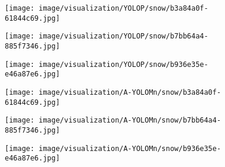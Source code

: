 \documentclass[lettersize,journal]{IEEEtran}
\begin{document}
\begin{figure*}[!h]
    \centering
    \begin{subfigure}[b]{0.05\textwidth}
        \centering
        \vspace{0.6cm} 
    \end{subfigure}\begin{subfigure}{0.25\textwidth}
        \centering
        \texttt{[image: image/visualization/YOLOP/snow/b3a84a0f-61844c69.jpg]}
    \end{subfigure}\hspace{0.5cm}
    \begin{subfigure}{0.25\textwidth}
        \centering
        \texttt{[image: image/visualization/YOLOP/snow/b7bb64a4-885f7346.jpg]}
    \end{subfigure}\hspace{0.5cm}
    \begin{subfigure}{0.25\textwidth}
        \centering
        \texttt{[image: image/visualization/YOLOP/snow/b936e35e-e46a87e6.jpg]}
    \end{subfigure}
    
    \medskip

    \begin{subfigure}[b]{0.05\textwidth}
        \centering
        \vspace{0.2cm}
    \end{subfigure}\begin{subfigure}{0.25\textwidth}
        \centering
        \texttt{[image: image/visualization/A-YOLOMn/snow/b3a84a0f-61844c69.jpg]}
    \end{subfigure}\hspace{0.5cm}
    \begin{subfigure}{0.25\textwidth}
        \centering
        \texttt{[image: image/visualization/A-YOLOMn/snow/b7bb64a4-885f7346.jpg]}
    \end{subfigure}\hspace{0.5cm}
    \begin{subfigure}{0.25\textwidth}
        \centering
        \texttt{[image: image/visualization/A-YOLOMn/snow/b936e35e-e46a87e6.jpg]}
    \end{subfigure}

    \medskip
    

\end{figure*}
\end{document}
